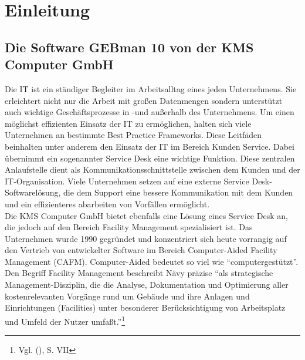 \section{Einleitung}


\subsection{Die Software GEBman 10 von der KMS Computer GmbH}
\noindent
Die IT ist ein ständiger Begleiter im Arbeitsalltag eines jeden Unternehmens. Sie erleichtert nicht nur die Arbeit mit großen Datenmengen sondern unterstützt auch wichtige Geschäftsprozesse in -und außerhalb des Unternehmens. Um einen möglichst effizienten Einsatz der IT zu ermöglichen, halten sich viele Unternehmen an bestimmte Best Practice Frameworks. Diese Leitfäden beinhalten unter anderem den Einsatz der IT im Bereich Kunden Service. Dabei übernimmt ein sogenannter Service Desk eine wichtige Funktion. Diese zentralen Anlaufstelle dient als Kommunikationsschnittstelle zwischen dem Kunden und der IT-Organisation. Viele Unternehmen setzen auf eine externe Service Desk-Softwarelösung, die dem Support eine bessere Kommunikation mit dem Kunden und ein effizienteres abarbeiten von Vorfällen ermöglicht.\\

\noindent
Die KMS Computer GmbH bietet ebenfalls eine Lösung eines Service Desk an, die jedoch auf den Bereich Facility Management spezialisiert ist. Das Unternehmen wurde 1990 gegründet und konzentriert sich heute vorrangig auf den Vertrieb von entwickelter Software im Bereich Computer-Aided Facility Management (CAFM). Computer-Aided bedeutet so viel wie \enquote{computergestützt}. Den Begriff Facility Management beschreibt Nävy präzise \enquote{als strategische Management-Disziplin, die die Analyse, Dokumentation und Optimierung aller kostenrelevanten Vorgänge rund um Gebäude und ihre Anlagen und Einrichtungen (Facilities) unter besonderer Berücksichtigung von Arbeitsplatz und Umfeld der Nutzer umfaßt.}\footnote{Vgl. \citeauthor{Naevy} (\citeyear{Naevy}), S. VII}\\

